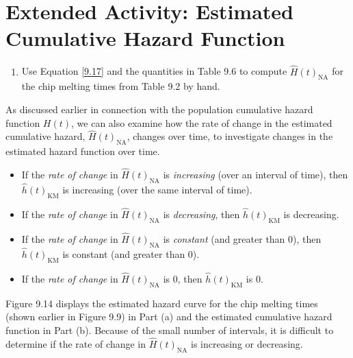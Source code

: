 \documentclass[
]{report}
\providecommand{\tightlist}{%
  \setlength{\itemsep}{0pt}\setlength{\parskip}{0pt}}
\begin{document}
\section*{Extended Activity: Estimated Cumulative Hazard Function}\label{extended-activity-estimated-cumulative-hazard-function}

\begin{enumerate}
\def\labelenumi{\arabic{enumi}.}
\setcounter{enumi}{47}
\tightlist
\item
  Use Equation \ref{9.17} and the quantities in Table 9.6 to compute \(\widehat H(t)_{\mathrm{NA}}\) for the chip melting times from Table 9.2 by hand.
\end{enumerate}

As discussed earlier in connection with the population cumulative hazard function \(H(t)\), we can also examine how the rate of change in the estimated cumulative hazard, \(\widehat H(t)_{\mathrm{NA}}\), changes over time, to investigate changes in the estimated hazard function over time.

\begin{itemize}
\tightlist
\item
  If the \emph{rate of change} in \(\widehat H(t)_{\mathrm{NA}}\) is \emph{increasing} (over an interval of time), then \(\hat h(t)_{\mathrm{KM}}\) is increasing (over the same interval of time).\\
\item
  If the \emph{rate of change} in \(\widehat H(t)_{\mathrm{NA}}\) is \emph{decreasing}, then \(\hat h(t)_{\mathrm{KM}}\) is decreasing.\\
\item
  If the \emph{rate of change} in \(\widehat H(t)_{\mathrm{NA}}\) is \emph{constant} (and greater than 0), then \(\hat h(t)_{\mathrm{KM}}\) is constant (and greater than 0).\\
\item
  If the \emph{rate of change} in \(\widehat H(t)_{\mathrm{NA}}\) is 0, then \(\hat h(t)_{\mathrm{KM}}\) is 0.
\end{itemize}

Figure 9.14 displays the estimated hazard curve for the chip melting times (shown earlier in Figure 9.9) in Part (a) and the estimated cumulative hazard function in Part (b). Because of the small number of intervals, it is difficult to determine if the rate of change in \(\widehat H(t)_{\mathrm{NA}}\) is increasing or decreasing.
\end{document}
